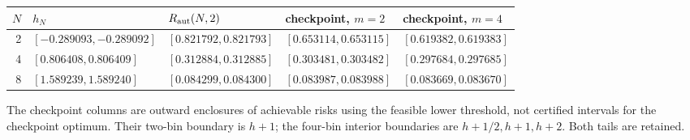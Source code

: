 \begin{center}
\small
\begin{tabular}{@{}rllll@{}}
\toprule
$N$ & $h_N$ & $R_{\mathrm{aut}}(N,2)$ & checkpoint, $m=2$ & checkpoint, $m=4$ \\
\midrule
2 & $[-0.289093, -0.289092]$ & $[0.821792, 0.821793]$ & $[0.653114, 0.653115]$ & $[0.619382, 0.619383]$ \\
4 & $[0.806408, 0.806409]$ & $[0.312884, 0.312885]$ & $[0.303481, 0.303482]$ & $[0.297684, 0.297685]$ \\
8 & $[1.589239, 1.589240]$ & $[0.084299, 0.084300]$ & $[0.083987, 0.083988]$ & $[0.083669, 0.083670]$ \\
\bottomrule
\end{tabular}
\end{center}
The checkpoint columns are outward enclosures of achievable risks using the feasible lower threshold, not certified intervals for the checkpoint optimum. Their two-bin boundary is $h+1$; the four-bin interior boundaries are $h+1/2,h+1,h+2$. Both tails are retained.
